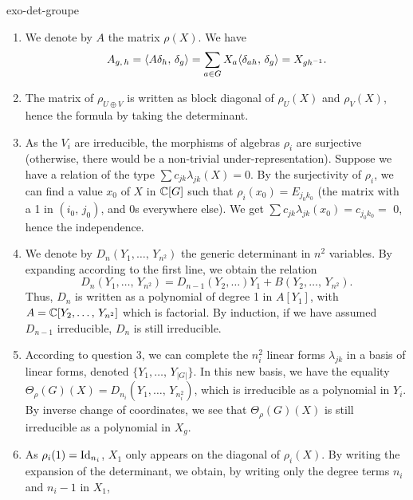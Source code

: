  
\begin{correction}{exo-det-groupe}
 \begin{enumerate}
\item We denote by $ A $ the matrix $ \rho (X) $. We have
\begin{equation*}
A_{g, \, h} = \langle A \delta_h,\,\delta_g\rangle = \sum_{a \in G}{X_a \langle \delta_{ah},\,\delta_g\rangle} = X_{gh^{-1}}.
\end{equation*}
 
\item The matrix of $ \rho_{U \oplus V} $ is written as block diagonal of $ \rho_U (X) $ and $ \rho_V (X) $, hence the formula by taking the determinant.
\item As the $ V_i $ are irreducible, the morphisms of algebras $ \rho_i $ are surjective (otherwise, there would be a non-trivial under-representation). Suppose we have a relation of the type $ \sum{c_{jk} \lambda_{jk} (X)} = 0 $. By the surjectivity of $ \rho_i $, we can find a value $ x_0 $ of $ X $ in $ \mathbb{C} [G] $ such that $ \rho_i (x_0) = E_{j_0 k_0} $ (the matrix with a 1 in $ (i_0, \, j_0) $, and 0s everywhere else). We get $ \sum{c_{jk} \lambda_{jk} (x_0)} = c_{j_0 k_0} = $ 0, hence the independence.
\item We denote by $ D_n (Y_1, \ldots, \, Y_{n^2}) $ the generic determinant in $ n^2 $ variables. By expanding according to the first line, we obtain the relation
\begin{equation*}
D_n (Y_1, \ldots, \, Y_{n^2}) = D_{n-1} (Y_2, \ldots) Y_1 + B (Y_2, \ldots, \, Y_{n^2}).
\end{equation*}
Thus, $ D_n $ is written as a polynomial of degree 1 in $ A [Y_1] $, with $ A = \mathbb{C} [Y_2, \ldots, \, Y_{n^2}] $ which is factorial. By induction, if we have assumed $ D_{n-1} $ irreducible, $ D_n $ is still irreducible.
\item According to question 3, we can complete the $ n_i^2 $ linear forms $ \lambda_{jk} $ in a basis of linear forms, denoted $ \{Y_1, \ldots, \, Y_{|G|}\} $. In this new basis, we have the equality $ \Theta_\rho (G) (X) = D_{n_i} (Y_1, \ldots, \, Y_{n_i^2}) $, which is irreducible as a polynomial in $ Y_i $. By inverse change of coordinates, we see that $ \Theta_\rho (G) (X) $ is still irreducible as a polynomial in $ X_g $.
\item As $ \rho_i (1) = \operatorname{Id}_{n_i} $, $ X_1 $ only appears on the diagonal of $ \rho_i (X) $. By writing the expansion of the determinant, we obtain, by writing only the degree terms $ n_i $ and $ n_i-1 $ in $ X_1 $,

\end{enumerate}
\end{correction}
